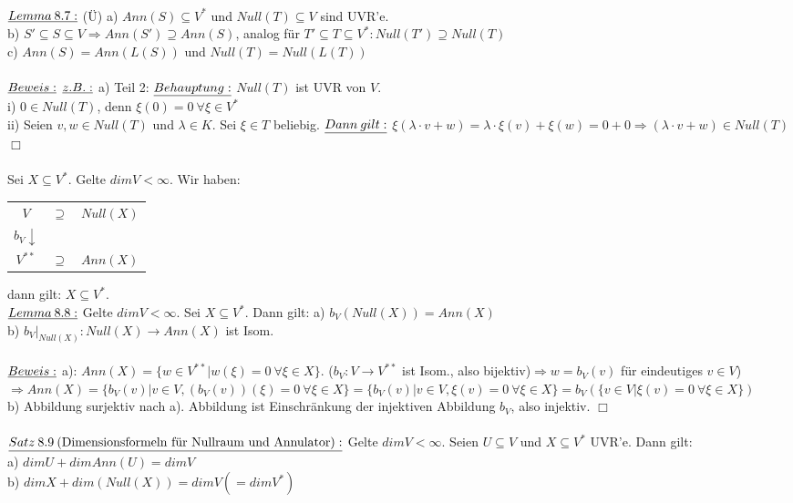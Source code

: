 \documentclass[fleqn, a4paper, 11pt]{scrartcl}
\theoremstyle{definition}
\begin{document}
\\
$\uline{Lemma\:8.7:}$ (\"U) a) $Ann(S)\subseteq V^{\ast}$ und $Null(T)\subseteq V$ sind UVR'e.\\
b) $S'\subseteq S\subseteq V\Rightarrow Ann(S')\supseteq Ann(S)$, analog für $T'\subseteq T\subseteq V^{\ast}:Null(T')\supseteq Null(T)$\\
c) $Ann(S)=Ann(L(S))$ und $Null(T)=Null(L(T))$\\
\\
$\uline{Beweis:}$ $\uline{z.B.:}$ a) Teil 2: $\uline{Behauptung:}$ $Null(T)$ ist UVR von $V$.\\
i) $0\in Null(T)$, denn $\xi(0)=0\:\forall\xi\in V^{\ast}$\\
ii) Seien $v,w\in Null(T)$ und $\lambda\in K$. Sei $\xi\in T$ beliebig. $\uline{Dann\:gilt:}$ $\xi(\lambda\cdot v+w)=\lambda\cdot\xi(v)+\xi(w)=0+0\Rightarrow (\lambda\cdot v+w)\in Null(T)$ \hfill $\Box$\\
\\
Sei $X\subseteq V^{\ast}$. Gelte $dim V<\infty$. Wir haben: \begin{tabular}{ccc}
	$V$ & $\supseteq$ & $Null(X)$\\
	$b_V \downarrow$ &&\\
	$V^{\ast\ast}$&$\supseteq$&$Ann(X)$
\end{tabular} dann gilt: $X\subseteq V^{\ast}$. 
\\
$\uline{Lemma\:8.8:}$ Gelte $dim V<\infty$. Sei $X\subseteq V^{\ast}$. Dann gilt: a) $b_V(Null(X))=Ann(X)$\\
b) $b_V|_{Null(X)}:Null(X)\rightarrow Ann(X)$ ist Isom.\\
\\
$\uline{Beweis:}$ a): $Ann(X)=\{w\in V^{\ast\ast}|w(\xi)=0\:\forall\xi\in X\}$. ($b_V:V\rightarrow V^{\ast\ast}$ ist Isom., also bijektiv)$\Rightarrow w=b_V(v)$ für eindeutiges $v\in V$)$\Rightarrow Ann(X)=\{b_V(v)|v\in V,(b_V(v))(\xi)=0\:\forall\xi\in X\}=\{b_V(v)|v\in V,\xi(v)=0\:\forall\xi\in X\}=b_V(\{v\in V|\xi(v)=0\:\forall\xi\in X\})$\\
b) Abbildung surjektiv nach a). Abbildung ist Einschränkung der injektiven Abbildung $b_V$, also injektiv. \hfill $\Box$\\
\\
$\uline{Satz\:8.9\:(\text{Dimensionsformeln für Nullraum und Annulator}):}$ Gelte $dim V<\infty$. Seien $U\subseteq V$ und $X\subseteq V^{\ast}$ UVR'e. Dann gilt:\\
a) $dim U+dim Ann(U)=dim V$\\
b) $dim X+dim(Null(X))=dim V(=dim V^{\ast})$\\
\end{document}
